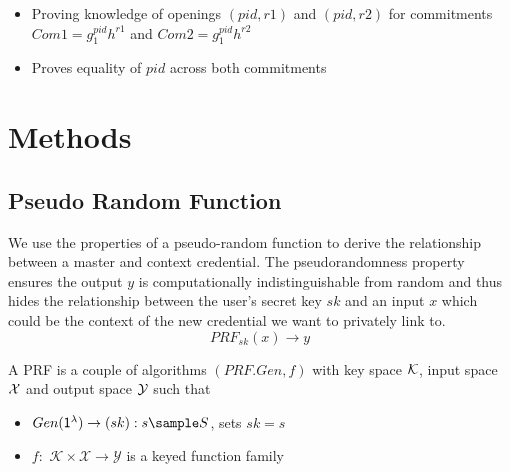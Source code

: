 \begin{itemize}
    \item Proving knowledge of openings $(pid, r1)$ and $(pid, r2)$ for commitments $Com1 = g_1^{pid}h^{r1}$ and $Com2 = g_1^{pid}h^{r2}$
    \item Proves equality of $pid$ across both commitments
\end{itemize}



\newpage
\section{Methods}



\subsection{Pseudo Random Function}
We use the properties of a pseudo-random function to derive the relationship between a master and context credential. The pseudorandomness property ensures the output $y$ is computationally indistinguishable from random and thus hides the relationship between the user's secret key $sk$ and an input $x$ which could be the context of the new credential we want to privately link to.
\[
    PRF_{sk}(x) \to y
\]

\begin{definition}
    A PRF is a couple of algorithms $(PRF.Gen, f)$ with key space $\mathcal{K}$, input space $\mathcal{X}$ and output space $\mathcal{Y}$ such that 
    \begin{itemize}
        \item $Gen(\secparam) \to (sk): s \sample S$, sets $sk = s$
        \item $f:$ $\mathcal{K} \times \mathcal{X} \to \mathcal{Y}$ is a keyed function family
    \end{itemize}
\end{definition}

